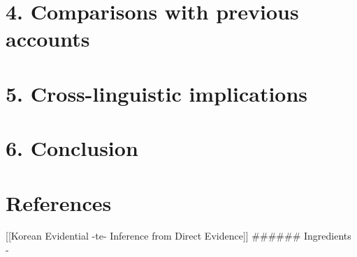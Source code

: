 \hypertarget{comparisons-with-previous-accounts}{%
\section{4. Comparisons with previous
accounts}\label{comparisons-with-previous-accounts}}

\hypertarget{cross-linguistic-implications}{%
\section{5. Cross-linguistic
implications}\label{cross-linguistic-implications}}

\hypertarget{conclusion}{%
\section{6. Conclusion}\label{conclusion}}

\hypertarget{references}{%
\section{References}\label{references}}

{[}{[}Korean Evidential -te- Inference from Direct Evidence{]}{]}
\#\#\#\#\#\# Ingredients -

\begin{Shaded}
\begin{Highlighting}[]
\end{Highlighting}
\end{Shaded}

\begin{Shaded}
\begin{Highlighting}[]
\end{Highlighting}
\end{Shaded}
